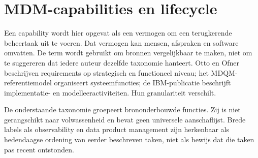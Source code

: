 \section{MDM-capabilities en lifecycle}
Een capability wordt hier opgevat als een vermogen om een terugkerende beheertaak uit te voeren. Dat vermogen kan mensen, afspraken en software omvatten. De term wordt gebruikt om bronnen vergelijkbaar te maken, niet om te suggereren dat iedere auteur dezelfde taxonomie hanteert. Otto en Ofner beschrijven requirements op strategisch en functioneel niveau; het MDQM-referentiemodel organiseert systeemfuncties; de IBM-publicatie beschrijft implementatie- en modelleeractiviteiten. Hun granulariteit verschilt. \parencite{L20,L05,P01}

De onderstaande taxonomie groepeert brononderbouwde functies. Zij is niet gerangschikt naar volwassenheid en bevat geen universele aanschaflijst. Brede labels als observability en data product management zijn herkenbaar als hedendaagse ordening van eerder beschreven taken, niet als bewijs dat die taken pas recent ontstonden.

